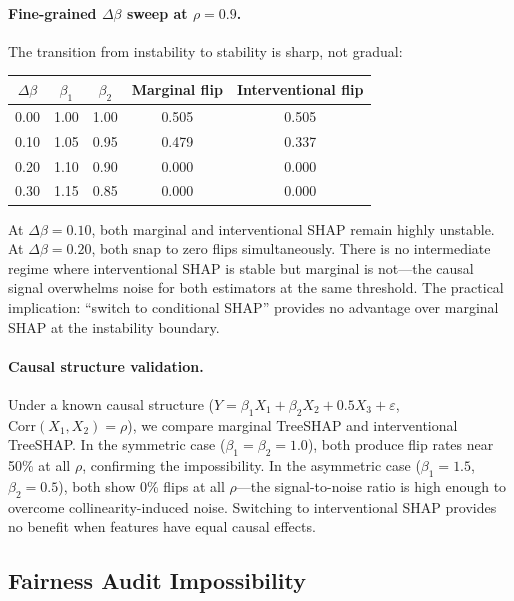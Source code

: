 \documentclass{jmlr}
\begin{document}
\paragraph{Fine-grained $\Delta\beta$ sweep at $\rho = 0.9$.}
The transition from instability to stability is sharp, not gradual:

\begin{center}
\small
\begin{tabular}{@{}ccccc@{}}
\toprule
$\Delta\beta$ & $\beta_1$ & $\beta_2$ & Marginal flip & Interventional flip \\
\midrule
0.00 & 1.00 & 1.00 & 0.505 & 0.505 \\
0.10 & 1.05 & 0.95 & 0.479 & 0.337 \\
0.20 & 1.10 & 0.90 & 0.000 & 0.000 \\
0.30 & 1.15 & 0.85 & 0.000 & 0.000 \\
\bottomrule
\end{tabular}
\end{center}

At $\Delta\beta = 0.10$, both marginal and interventional SHAP remain highly unstable. At $\Delta\beta = 0.20$, both snap to zero flips simultaneously. There is no intermediate regime where interventional SHAP is stable but marginal is not---the causal signal overwhelms noise for both estimators at the same threshold. The practical implication: ``switch to conditional SHAP'' provides no advantage over marginal SHAP at the instability boundary.

\paragraph{Causal structure validation.}
Under a known causal structure ($Y = \beta_1 X_1 + \beta_2 X_2 + 0.5 X_3 + \varepsilon$, $\text{Corr}(X_1, X_2) = \rho$), we compare marginal TreeSHAP and interventional TreeSHAP. In the symmetric case ($\beta_1 = \beta_2 = 1.0$), both produce flip rates near 50\% at all $\rho$, confirming the impossibility. In the asymmetric case ($\beta_1 = 1.5$, $\beta_2 = 0.5$), both show 0\% flips at all $\rho$---the signal-to-noise ratio is high enough to overcome collinearity-induced noise. Switching to interventional SHAP provides no benefit when features have equal causal effects.

\subsection{Fairness Audit Impossibility}
\label{sec:fairness}
\end{document}
